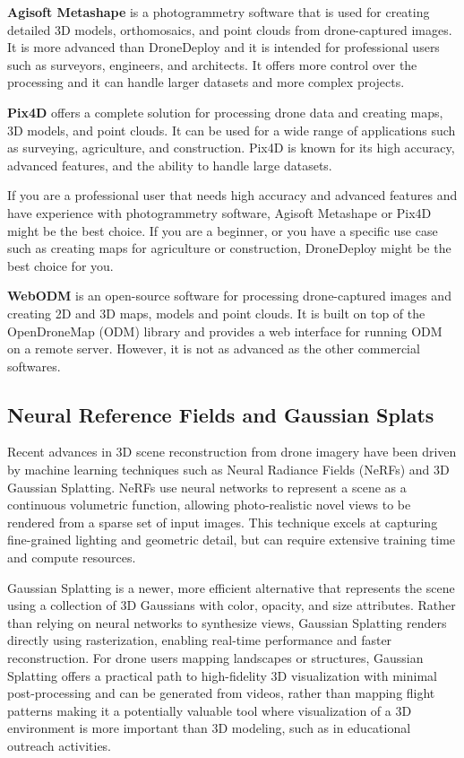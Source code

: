 \documentclass[
  12pt,
]{book}
\begin{document}
\textbf{Agisoft Metashape} is a photogrammetry software that is used for creating detailed 3D models, orthomosaics, and point clouds from drone-captured images. It is more advanced than DroneDeploy and it is intended for professional users such as surveyors, engineers, and architects. It offers more control over the processing and it can handle larger datasets and more complex projects.

\textbf{Pix4D} offers a complete solution for processing drone data and creating maps, 3D models, and point clouds. It can be used for a wide range of applications such as surveying, agriculture, and construction. Pix4D is known for its high accuracy, advanced features, and the ability to handle large datasets.

If you are a professional user that needs high accuracy and advanced features and have experience with photogrammetry software, Agisoft Metashape or Pix4D might be the best choice. If you are a beginner, or you have a specific use case such as creating maps for agriculture or construction, DroneDeploy might be the best choice for you.

\textbf{WebODM} is an open-source software for processing drone-captured images and creating 2D and 3D maps, models and point clouds. It is built on top of the OpenDroneMap (ODM) library and provides a web interface for running ODM on a remote server. However, it is not as advanced as the other commercial softwares.

\subsection{Neural Reference Fields and Gaussian Splats}\label{neural-reference-fields-and-gaussian-splats}

Recent advances in 3D scene reconstruction from drone imagery have been driven by machine learning techniques such as Neural Radiance Fields (NeRFs) and 3D Gaussian Splatting. NeRFs use neural networks to represent a scene as a continuous volumetric function, allowing photo-realistic novel views to be rendered from a sparse set of input images. This technique excels at capturing fine-grained lighting and geometric detail, but can require extensive training time and compute resources.

Gaussian Splatting is a newer, more efficient alternative that represents the scene using a collection of 3D Gaussians with color, opacity, and size attributes. Rather than relying on neural networks to synthesize views, Gaussian Splatting renders directly using rasterization, enabling real-time performance and faster reconstruction. For drone users mapping landscapes or structures, Gaussian Splatting offers a practical path to high-fidelity 3D visualization with minimal post-processing and can be generated from videos, rather than mapping flight patterns making it a potentially valuable tool where visualization of a 3D environment is more important than 3D modeling, such as in educational outreach activities.
\end{document}
